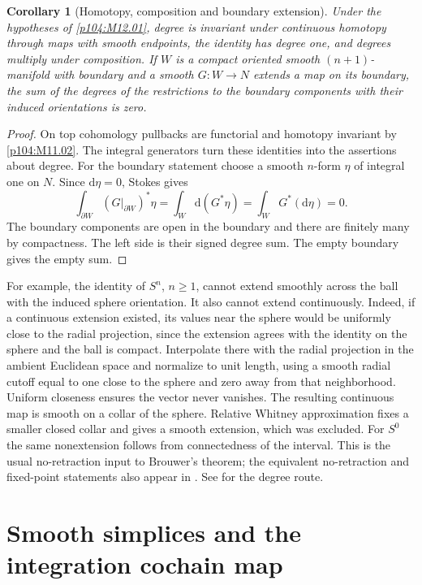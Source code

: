\documentclass[11pt,oneside,openany]{book}
\newtheorem{corollary}[theorem]{Corollary}
\theoremstyle{definition}
\theoremstyle{remark}
\newcommand{\dd}{\mathrm d}
\begin{document}
\begin{corollary}[Homotopy, composition and boundary extension]
\label{p104:M12.02}
Under the hypotheses of \cref{p104:M12.01}, degree is invariant
under continuous homotopy through maps with smooth endpoints,
the identity has degree one, and degrees multiply under
composition. If \(W\) is a compact oriented smooth
\((n+1)\)-manifold with boundary and a smooth \(G:W\to N\)
extends a map on its boundary, the sum of the degrees of
the restrictions to the boundary components with their
induced orientations is zero.
\end{corollary}
\begin{proof}
On top cohomology pullbacks are functorial and homotopy
invariant by \cref{p104:M11.02}. The integral generators turn
these identities into the assertions about degree. For
the boundary statement choose a smooth \(n\)-form
\(\eta\) of integral one on \(N\). Since \(\dd\eta=0\),
Stokes gives
\[
 \int_{\partial W}(G|_{\partial W})^*\eta
       =\int_W \dd(G^*\eta)=\int_W G^*(\dd\eta)=0 .
\]
The boundary components are open in the boundary and there
are finitely many by compactness. The left side is their
signed degree sum. The empty boundary gives the empty sum.
\end{proof}
For example, the identity of \(S^{n}\), \(n\geq1\), cannot
extend smoothly across the ball with the induced sphere
orientation. It also cannot extend continuously. Indeed,
if a continuous extension existed, its values near the
sphere would be uniformly close to the radial projection,
since the extension agrees with the identity on the sphere
and the ball is compact. Interpolate there with the radial
projection in the ambient Euclidean space and normalize to
unit length, using a smooth radial cutoff equal to one
close to the sphere and zero away from that neighborhood.
Uniform closeness ensures the vector never vanishes.
The resulting continuous map is smooth on a collar of the
sphere. Relative Whitney approximation fixes a smaller
closed collar and gives a smooth extension, which was
excluded. For \(S^0\) the same nonextension follows from
connectedness of the interval. This is the usual no-retraction
input to Brouwer's theorem; the equivalent no-retraction
and fixed-point statements also appear in \cite[Chapter 17]{d10}.
See \cite[pp.~457--460]{lee} for the degree route.

\section{Smooth simplices and the integration cochain map}
\end{document}
